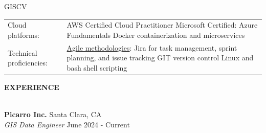 \documentclass[letterpaper]{article}
\newcommand{\lineunder} {
        \vspace*{-8pt} \\
        \hspace*{-18pt} \hrulefill \\
    }
\newcommand{\header} [1] {
        \vspace{9pt}
        {\hspace*{-18pt}\vspace*{6pt} \large \textbf {#1}}
        \vspace*{-6pt} \lineunder
        \vspace{2pt}
    }
\newcommand{\employer}[4]{
        \vspace{3pt}
        \textbf{#1}  %
        \hfill #2\\  %
        \textit{#3}  %
        \hfill #4\\  %
        \vspace{3mm}
    }
\newenvironment{skillslist}
        {
            \hspace*{-0.07in}\begin{tabular}[t]{ l L{5.17in} }
        }{
            \end{tabular}
        }
\newcommand{\impt}[1]{\uline{#1}}
\begin{document}
\begin{taggedblock}{GISCV}
\begin{skillslist}
            Cloud platforms:&
                AWS Certified Cloud Practitioner \linebreak
                Microsoft Certified: Azure Fundamentals \linebreak
                Docker containerization and microservices \linebreak
                \\
            Technical proficiencies:&
                \impt{Agile methodologies}: Jira for task management,
                    sprint planning, and issue tracking \linebreak
                GIT version control \linebreak
                Linux and bash shell scripting \linebreak
                \\
        \end{skillslist}
    \end{taggedblock}



\header{EXPERIENCE}



    \employer
        {Picarro Inc.}
        {Santa Clara, CA}
        {GIS Data Engineer}
        {June 2024 - Current}
\end{document}
